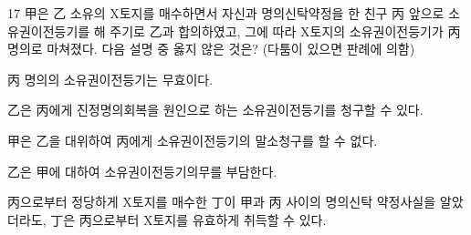 \begin{question}{17}
甲은 乙 소유의 X토지를 매수하면서 자신과 명의신탁약정을 한 친구 丙 앞으로 소유권이전등기를 해 주기로 乙과 합의하였고, 그에 따라 X토지의 소유권이전등기가 丙 명의로 마쳐졌다. 다음 설명 중 옳지 않은 것은? (다툼이 있으면 판례에 의함)
\begin{choices}
  \item 丙 명의의 소유권이전등기는 무효이다.
  \item 乙은 丙에게 진정명의회복을 원인으로 하는 소유권이전등기를 청구할 수 있다.
  \item 甲은 乙을 대위하여 丙에게 소유권이전등기의 말소청구를 할 수 없다.
  \item 乙은 甲에 대하여 소유권이전등기의무를 부담한다.
  \item 丙으로부터 정당하게 X토지를 매수한 丁이 甲과 丙 사이의 명의신탁 약정사실을 알았더라도, 丁은 丙으로부터 X토지를 유효하게 취득할 수 있다.
\end{choices}
\end{question}
